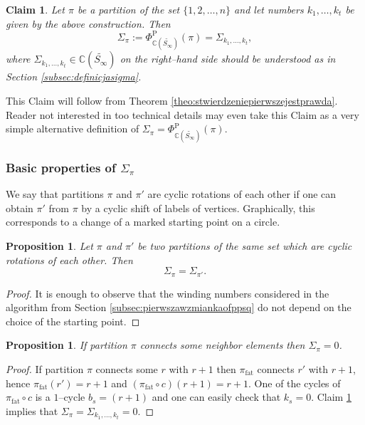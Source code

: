\documentclass[12pt,dvips]{amsart}
\numberwithin{equation}{section} \numberwithin{figure}{section}
\theoremstyle{plain}
\newtheorem{proposition}[lemma]{Proposition}
\newtheorem{claim}[lemma]{Claim}
\theoremstyle{definition}
\theoremstyle{remark}
\newcommand{\C}{{\mathbb{C}}}
\newcommand{\Sn}[1]{{{S}}_{#1}}
\newcommand{\fppsinf}{\Phi^{\pp}_{\C(\PartPerm{\infty})}}
\newcommand{\PartPerm}[1]{\widetilde{\Sn{#1}}}
\DeclareMathOperator{\fat}{fat}
\DeclareMathOperator{\pp}{P}
\begin{document}
\begin{claim}
\label{claim:definicjasigma} Let $\pi$ be a partition of the set
$\{1,2,\dots,n\}$ and let numbers $k_1,\dots,k_t$ be given by the
above construction. Then
$$\Sigma_\pi:=\fppsinf(\pi)=\Sigma_{k_1,\dots,k_t},$$
where $\Sigma_{k_1,\dots,k_t}\in\C(\PartPerm{\infty})$ on the
right--hand side should be understood as in Section
\ref{subsec:definicjasigma}.
\end{claim}
This Claim will follow from Theorem
\ref{theo:stwierdzeniepierwszejestprawda}. Reader not interested in
too technical details may even take this Claim as a very simple
alternative definition of $\Sigma_\pi=\fppsinf(\pi)$.



\subsubsection{Basic properties of $\Sigma_{\pi}$} We say that
partitions $\pi$ and $\pi'$ are cyclic rotations of each other if
one can obtain $\pi'$ from $\pi$ by a cyclic shift of labels of
vertices. Graphically, this corresponds to a change of a marked
starting point on a circle.
\begin{proposition}
\label{prop:rotacjajestok} Let $\pi$ and $\pi'$ be two partitions of
the same set which are cyclic rotations of each other. Then
$$\Sigma_{\pi}=\Sigma_{\pi'}.$$
\end{proposition}
\begin{proof}
It is enough to observe that the winding numbers considered in the
algorithm from Section \ref{subsec:pierwszawzmiankaofppsq} do not
depend on the choice of the starting point.
\end{proof}


\begin{proposition}
If partition $\pi$ connects some neighbor elements then
$\Sigma_\pi=0$.
\end{proposition}
\begin{proof}
If partition $\pi$ connects some $r$ with $r+1$ then $\pi_{\fat}$
connects $r'$ with $r+1$, hence $\pi_{\fat}(r')=r+1$ and
$(\pi_{\fat}\circ c)(r+1)=r+1$. One of the cycles of
$\pi_{\fat}\circ c$ is a $1$--cycle $b_s=(r+1)$ and one can easily
check that $k_s=0$. Claim \ref{claim:definicjasigma} implies that
$\Sigma_\pi=\Sigma_{k_1,\dots,k_t}=0$.
\end{proof}
\end{document}

